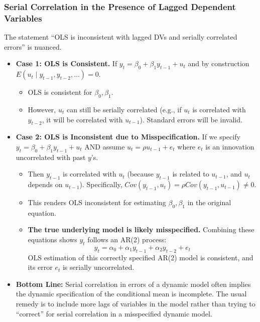 \documentclass[a4paper, 10pt]{article}
\theoremstyle{definition}	%
\begin{document}
\subsubsection{Serial Correlation in the Presence of Lagged Dependent Variables}
The statement ``OLS is inconsistent with lagged DVs and serially correlated errors'' is nuanced.
\begin{itemize}
    \item \textbf{Case 1: OLS is Consistent.}
    If \(y_t = \beta_0 + \beta_1 y_{t-1} + u_t\) and by construction \(E(u_t \mid y_{t-1}, y_{t-2}, \dots) = 0\).
    \begin{itemize}
        \item OLS is consistent for \(\beta_0, \beta_1\).
        \item However, \(u_t\) can still be serially correlated (e.g., if \(u_t\) is correlated with \(y_{t-2}\), it will be correlated with \(u_{t-1}\)). Standard errors will be invalid.
    \end{itemize}
    \item \textbf{Case 2: OLS is Inconsistent due to Misspecification.}
    If we specify \(y_t = \beta_0 + \beta_1 y_{t-1} + u_t\) AND assume \(u_t = \rho u_{t-1} + e_t\) where \(e_t\) is an innovation uncorrelated with past \(y\)'s.
    \begin{itemize}
        \item Then \(y_{t-1}\) is correlated with \(u_t\) (because \(y_{t-1}\) is related to \(u_{t-1}\), and \(u_t\) depends on \(u_{t-1}\)). Specifically, \(Cov(y_{t-1}, u_t) = \rho Cov(y_{t-1}, u_{t-1}) \neq 0\).
        \item This renders OLS inconsistent for estimating \(\beta_0, \beta_1\) in the original equation.
        \item \textbf{The true underlying model is likely misspecified.} Combining these equations shows \(y_t\) follows an AR(2) process:
        \[ y_t = \alpha_0 + \alpha_1 y_{t-1} + \alpha_2 y_{t-2} + e_t \]
        OLS estimation of this correctly specified AR(2) model is consistent, and its error \(e_t\) is serially uncorrelated.
    \end{itemize}
    \item \textbf{Bottom Line:} Serial correlation in errors of a dynamic model often implies the dynamic specification of the conditional mean is incomplete. The usual remedy is to include more lags of variables in the model rather than trying to ``correct'' for serial correlation in a misspecified dynamic model.
\end{itemize}
\end{document}
